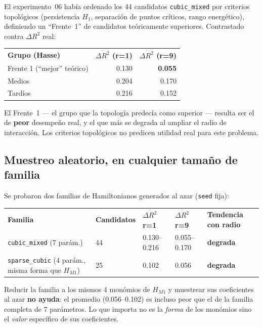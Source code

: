 \documentclass[11pt, a4paper]{article}
\newcommand{\TH}[1]{\cellcolor{cTHbg}\color{white}\textbf{#1}}
\newcommand{\bad}[1]{\color{cBad}\textbf{#1}}
\begin{document}
El experimento~06 hab\'ia ordenado los 44 candidatos \texttt{cubic\_mixed}
por criterios topol\'ogicos (persistencia $H_1$, separaci\'on de puntos
cr\'iticos, rango energ\'etico), definiendo un ``Frente~1'' de candidatos
te\'oricamente superiores. Contrastado contra $\Delta R^2$ real:

\medskip
\begin{center}
\begin{tabular}{lrr}
  \TH{Grupo (Hasse)} & \TH{$\overline{\Delta R^2}$ (r=1)} & \TH{$\overline{\Delta R^2}$ (r=9)} \\[1pt]
  Frente 1 (``mejor'' te\'orico) & 0.130 & \bad{0.055} \\
  Medios                          & 0.204 & 0.170 \\
  Tard\'ios                       & 0.216 & 0.152 \\
\end{tabular}
\end{center}
\medskip

El Frente~1 --- el grupo que la topolog\'ia predec\'ia como superior ---
resulta ser el de \textbf{peor} desempe\~no real, y el que m\'as se
degrada al ampliar el radio de interacci\'on. Los criterios topol\'ogicos
no predicen utilidad real para este problema.

\subsection{Muestreo aleatorio, en cualquier tama\~no de familia}

Se probaron dos familias de Hamiltonianos generados al azar
(\texttt{seed} fija):

\medskip
\begin{center}
\begin{tabularx}{0.96\textwidth}{L{3.4cm}C{2cm}C{2.3cm}C{2.3cm}X}
  \TH{Familia} & \TH{Candidatos} & \TH{$\overline{\Delta R^2}$ r=1} & \TH{$\overline{\Delta R^2}$ r=9} & \TH{Tendencia con radio} \\[1pt]
  \texttt{cubic\_mixed} (7 par\'am.) & 44 & 0.130--0.216 & 0.055--0.170 & \bad{degrada} \\
  \texttt{sparse\_cubic} (4 par\'am., misma forma que $H_{M1}$) & 25 & 0.102 & 0.056 & \bad{degrada} \\
\end{tabularx}
\end{center}
\medskip

Reducir la familia a los mismos 4 mon\'omios de $H_{M1}$ y muestrear
sus coeficientes al azar \textbf{no ayuda}: el promedio (0.056--0.102)
es incluso peor que el de la familia completa de 7 par\'ametros. Lo que
importa no es la \emph{forma} de los mon\'omios sino el \emph{valor}
espec\'ifico de sus coeficientes.
\end{document}
